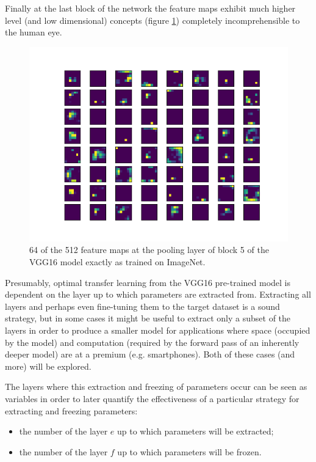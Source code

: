 Finally at the last block of the network the feature maps exhibit much higher level (and low dimensional) concepts (figure \ref{fig:vgg16_block5}) completely incomprehensible to the human eye.

\begin{figure}
    \centering
    \includegraphics[width=1.0\textwidth]{figs/vgg16_block5.png}
    \caption{64 of the 512 feature maps at the pooling layer of block 5 of the VGG16 model exactly as trained on ImageNet.}
    \label{fig:vgg16_block5}
\end{figure}

Presumably, optimal transfer learning from the VGG16 pre-trained model is dependent on the layer up to which parameters are extracted from. Extracting all layers and perhaps even fine-tuning them to the target dataset is a sound strategy, but in some cases it might be useful to extract only a subset of the layers in order to produce a smaller model for applications where space (occupied by the model) and computation (required by the forward pass of an inherently deeper model) are at a premium (e.g. smartphones). Both of these cases (and more) will be explored.

The layers where this extraction and freezing of parameters occur can be seen as variables in order to later quantify the effectiveness of a particular strategy for extracting and freezing parameters:

\begin{itemize}
    \item the number of the layer $e$ up to which parameters will be extracted;
    \item the number of the layer $f$ up to which parameters will be frozen.
\end{itemize}

